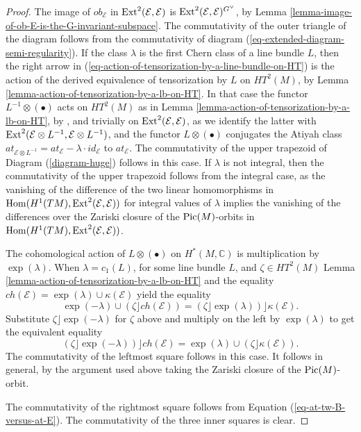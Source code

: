 \documentclass[12pt]{amsart}
\numberwithin{equation}{subsection}
\theoremstyle{plain}
\theoremstyle{definition}
\newcommand{\CC}{{\mathbb C}}
\newcommand{\E}{{\mathcal E}}
\newcommand{\Pic}{{\rm Pic}}
\newcommand{\Ext}{{\rm Ext}}
\newcommand{\Hom}{{\rm Hom}}
\newcommand{\End}{{\rm End}}
\newcommand{\Contract}{\rfloor}
\begin{document}
\begin{proof}
The image of $ob_\E$ in $\Ext^2(\E,\E)$ is $\Ext^2(\E,\E)^{G^\vee}$, by Lemma \ref{lemma-image-of-ob-E-is-the-G-invariant-subspace}.
The commutativity of the outer triangle of the diagram follows from the commutativity of diagram (\ref{eq-extended-diagram-semi-regularity}).
 If the class $\lambda$ is the first Chern class of a line bundle $L$, then the right arrow in (\ref{eq-action-of-tensorization-by-a-line-bundle-on-HT}) is the action
of the derived equivalence of tensorization by $L$ on $HT^2(M)$, by Lemma \ref{lemma-action-of-tensorization-by-a-lb-on-HT}. In that case the functor $L^{-1}\otimes(\bullet)$ acts on $HT^2(M)$ as in Lemma \ref{lemma-action-of-tensorization-by-a-lb-on-HT}, by \cite{calaque-et-al},  and trivially on $\Ext^2(\E,\E)$, as we identify the latter with $\Ext^2(\E\otimes L^{-1},\E\otimes L^{-1})$, and the functor $L\otimes (\bullet)$ conjugates the Atiyah class $at_{\E\otimes L^{-1}}=at_\E-\lambda\cdot id_\E$ to $at_\E$. 
The commutativity of the upper trapezoid of Diagram (\ref{diagram-huge}) follows in this case. If $\lambda$ is not integral, then the commutativity of the upper trapezoid follows from the integral case, as the vanishing of the difference of the two linear homomorphisms
in $\Hom(H^1(TM),\Ext^2(\E,\E))$ for integral values of $\lambda$ implies the vanishing of the differences over the Zariski closure of the $\Pic(M)$-orbits in $\Hom(H^1(TM),\Ext^2(\E,\E))$. 

 The cohomological action of $L\otimes(\bullet)$ on $H^*(M,\CC)$ is multiplication by $\exp(\lambda)$.
 When $\lambda=c_1(L)$, for some line bundle $L$, and 
$\zeta\in HT^2(M)$  Lemma \ref{lemma-action-of-tensorization-by-a-lb-on-HT} and the equality $ch(\E)=\exp(\lambda)\cup\kappa(\E)$ yield the equality
 \[
 \exp(-\lambda)\cup(\zeta\Contract ch(\E))=(\zeta\Contract \exp(\lambda))\Contract \kappa(\E).
 \]
 Substitute $\zeta\Contract \exp(-\lambda)$ for $\zeta$ above and multiply on the left by $\exp(\lambda)$  to get the equivalent equality
 \[
(\zeta\Contract \exp(-\lambda))\Contract ch(\E)=\exp(\lambda)\cup( \zeta\Contract \kappa(\E)).
 \]
 The commutativity of the leftmost square follows in this case. It follows in general, by the argument used above taking the  Zariski closure of the $\Pic(M)$-orbit. 
 
 The commutativity of the rightmost square follows from Equation (\ref{eq-at-tw-B-versus-at-E}).
The commutativity of the three inner squares is clear. 
\end{proof}
\end{document}

